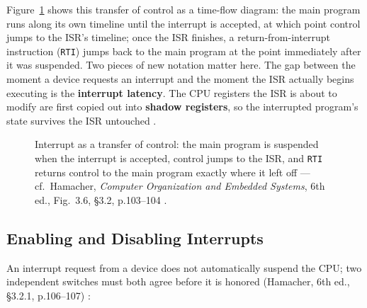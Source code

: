 \documentclass[11pt]{article}
\begin{document}
Figure~\ref{fig:interrupt-transfer} shows this transfer of control as a time-flow diagram: the main program runs along its own timeline until the interrupt is accepted, at which point control jumps to the ISR's timeline; once the ISR finishes, a return-from-interrupt instruction (\texttt{RTI}) jumps back to the main program at the point immediately after it was suspended. Two pieces of new notation matter here. The gap between the moment a device requests an interrupt and the moment the ISR actually begins executing is the \textbf{interrupt latency}. The CPU registers the ISR is about to modify are first copied out into \textbf{shadow registers}, so the interrupted program's state survives the ISR untouched \cite{Hamacher2002_computer_organization}.

\begin{figure}[h]
  \centering
  \caption{Interrupt as a transfer of control: the main program is suspended when the interrupt is accepted, control jumps to the ISR, and \texttt{RTI} returns control to the main program exactly where it left off --- cf.\ Hamacher, \textit{Computer Organization and Embedded Systems}, 6th ed., Fig.~3.6, \S3.2, p.103--104 \cite{Hamacher2002_computer_organization}.}
  \label{fig:interrupt-transfer}
\end{figure}

\subsection{Enabling and Disabling Interrupts}

An interrupt request from a device does not automatically suspend the CPU; two independent switches must both agree before it is honored (Hamacher, 6th ed., \S3.2.1, p.106--107) \cite{Hamacher2002_computer_organization}:
\end{document}
